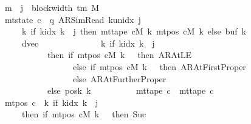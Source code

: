 \begin{isabellebody}
\ \ \ \ \ \ \ \ \ {\isasymand}\ m\ {\isasymle}\ j\ {\isacharasterisk}{\kern0pt}\ {\isacharparenleft}{\kern0pt}block{\isacharunderscore}{\kern0pt}width\ {\isacharparenleft}{\kern0pt}{\isasymGamma}{\isacharunderscore}{\kern0pt}tm\ M{\isacharparenright}{\kern0pt}\ {\isacharplus}{\kern0pt}\ {}{\isacharparenright}{\kern0pt}\isanewline
\ \ \ \ \ \ \ \ \ {\isasymand}\ mt{\isacharunderscore}{\kern0pt}state\ c\ {\isacharequal}{\kern0pt}\ {\isacharparenleft}{\kern0pt}q{\isacharcomma}{\kern0pt}\ AR{\isacharunderscore}{\kern0pt}SimRead{\isacharcomma}{\kern0pt}\ k{\isacharunderscore}{\kern0pt}unidx\ j{\isacharcomma}{\kern0pt}\ {}{\isacharcomma}{\kern0pt}\isanewline
\ \ \ \ \ \ \ \ \ \ \ \ \ \ {\isacharparenleft}{\kern0pt}{\isasymlambda}k{\isachardot}{\kern0pt}\ if\ k{\isacharunderscore}{\kern0pt}idx\ k\ {\isacharless}{\kern0pt}\ j\ then\ mt{\isacharunderscore}{\kern0pt}tape\ cM\ k\ {\isacharparenleft}{\kern0pt}mt{\isacharunderscore}{\kern0pt}pos\ cM\ k{\isacharparenright}{\kern0pt}\ else\ buf{}\ k{\isacharparenright}{\kern0pt}{\isacharcomma}{\kern0pt}\isanewline
\ \ \ \ \ \ \ \ \ \ \ \ \ \ dvec{\isacharcomma}{\kern0pt}\isanewline
\ \ \ \ \ \ \ \ \ \ \ \ \ \ {\isacharparenleft}{\kern0pt}{\isasymlambda}k{\isachardot}{\kern0pt}\ if\ k{\isacharunderscore}{\kern0pt}idx\ k\ {\isacharless}{\kern0pt}\ j\isanewline
\ \ \ \ \ \ \ \ \ \ \ \ \ \ \ \ \ \ \ \ then\ {\isacharparenleft}{\kern0pt}if\ mt{\isacharunderscore}{\kern0pt}pos\ cM\ k\ {\isacharequal}{\kern0pt}\ {}\ then\ AR{\isacharunderscore}{\kern0pt}AtLE\isanewline
\ \ \ \ \ \ \ \ \ \ \ \ \ \ \ \ \ \ \ \ \ \ \ \ \ \ else\ if\ mt{\isacharunderscore}{\kern0pt}pos\ cM\ k\ {\isacharequal}{\kern0pt}\ {}\ then\ AR{\isacharunderscore}{\kern0pt}AtFirstProper\isanewline
\ \ \ \ \ \ \ \ \ \ \ \ \ \ \ \ \ \ \ \ \ \ \ \ \ \ else\ AR{\isacharunderscore}{\kern0pt}AtFurtherProper{\isacharparenright}{\kern0pt}\isanewline
\ \ \ \ \ \ \ \ \ \ \ \ \ \ \ \ \ \ \ \ else\ posk{}\ k{\isacharparenright}{\kern0pt}{\isacharparenright}{\kern0pt}\isanewline
\ \ \ \ \ \ \ \ \ {\isasymand}\ mt{\isacharunderscore}{\kern0pt}tape\ c\ {\isacharequal}{\kern0pt}\ mt{\isacharunderscore}{\kern0pt}tape\ c{}\isanewline
\ \ \ \ \ \ \ \ \ {\isasymand}\ mt{\isacharunderscore}{\kern0pt}pos\ c\ {\isacharequal}{\kern0pt}\ {\isacharparenleft}{\kern0pt}{\isasymlambda}k{\isachardot}{\kern0pt}\ if\ k{\isacharunderscore}{\kern0pt}idx\ k\ {\isacharless}{\kern0pt}\ j\isanewline
\ \ \ \ \ \ \ \ \ \ \ \ \ \ then\ {\isacharparenleft}{\kern0pt}if\ mt{\isacharunderscore}{\kern0pt}pos\ cM\ k\ {\isacharequal}{\kern0pt}\ {}\ then\ Suc\ {}\isanewline

\end{isabellebody}
